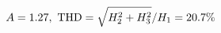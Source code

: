 \documentclass[preview]{standalone}
\begin{document}
\begin{align*}
\special{dvisvgm:raw <g id='unique000'>}A=1.27,\ \text{THD}=\sqrt{H_2^2+H_3^2}/H_1=20.7\%\special{dvisvgm:raw </g>}
\end{align*}
\end{document}
